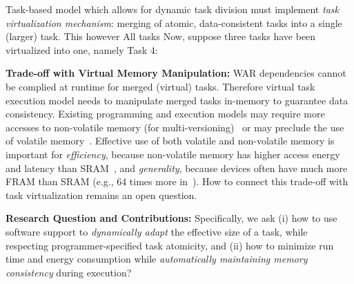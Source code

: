 \textbf{} Task-based model which allows for dynamic task division must implement \emph{task virtualization mechanism}: merging of atomic, data-consistent tasks into a single (larger) task. This however   All tasks  Now, suppose three tasks have been virtualized into one, namely Task 4: 

\textbf{Trade-off with Virtual Memory Manipulation:} WAR dependencies cannot be complied at runtime for merged (virtual) tasks. Therefore virtual task execution model needs to manipulate merged tasks in-memory to guarantee data consistency. Existing programming and execution models may require more accesses to non-volatile memory (for multi-versioning)~\cite{dino,chain} or may preclude the use of volatile memory~\cite{ratchet}. Effective use of both volatile and non-volatile memory is important for \emph{efficiency}, because non-volatile memory has higher access energy and latency than SRAM~\cite{nvp}, and \emph{generality}, because devices often have much more FRAM than SRAM (e.g., 64 times more in~\cite{wolverine}). How to connect this trade-off with task virtualization remains an open question.

\textbf{Research Question and Contributions:} Specifically, we ask (i) how to use software support to \emph{dynamically adapt} the effective size of a task, while respecting programmer-specified task atomicity, and (ii) how to minimize run time and energy consumption while \emph{automatically maintaining memory consistency} during execution?

